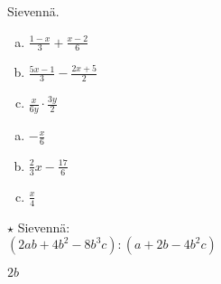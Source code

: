 \begin{tehtavasivu}
\begin{tehtava}
Sievennä.
	\begin{enumerate}[a)]
	\item $ \frac{1-x}{3} + \frac{x-2}{6}$
	\item $ \frac{5x-1}{3} - \frac{2x+5}{2}$
	\item $\frac{x}{6y} \cdot \frac{3y}{2}$
	\end{enumerate}

\begin{vastaus}
	\begin{enumerate}[a)]
	\item $ -\frac{x}{6}$
	\item $ \frac{2}{3} x - \frac{17}{6}$
	\item $\frac{x}{4}$
	\end{enumerate}
\end{vastaus}
\end{tehtava}


\begin{tehtava} $\star$
Sievennä: \\
$(2ab+4b^2-8b^3c):(a+2b-4b^2c)$
	\begin{vastaus}
	$2b$
	\end{vastaus}
\end{tehtava}

\end{tehtavasivu}